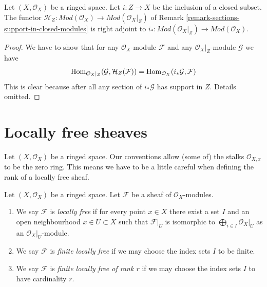 \begin{lemma}
\label{lemma-adjoint-section-with-support}
Let $(X, \mathcal{O}_X)$ be a ringed space. Let $i : Z \to X$ be the
inclusion of a closed subset. The functor
$\mathcal{H}_Z : \textit{Mod}(\mathcal{O}_X) \to
\textit{Mod}(\mathcal{O}_X|_Z)$ of
Remark \ref{remark-sections-support-in-closed-modules}
is right adjoint to
$i_* : \textit{Mod}(\mathcal{O}_X|_Z) \to \textit{Mod}(\mathcal{O}_X)$.
\end{lemma}

\begin{proof}
We have to show that for any $\mathcal{O}_X$-module $\mathcal{F}$
and any $\mathcal{O}_X|_Z$-module $\mathcal{G}$ we have
$$
\mathop{\mathrm{Hom}}\nolimits_{\mathcal{O}_X|_Z}(\mathcal{G}, \mathcal{H}_Z(\mathcal{F})) =
\mathop{\mathrm{Hom}}\nolimits_{\mathcal{O}_X}(i_*\mathcal{G}, \mathcal{F})
$$
This is clear
because after all any section of $i_*\mathcal{G}$ has support in $Z$.
Details omitted.
\end{proof}










\section{Locally free sheaves}
\label{section-locally-free}

\noindent
Let $(X, \mathcal{O}_X)$ be a ringed space.
Our conventions allow (some of) the stalks $\mathcal{O}_{X, x}$
to be the zero ring. This means we have to be a little careful
when defining the rank of a locally free sheaf.

\begin{definition}
\label{definition-locally-free}
\begin{reference}
\cite[Chapter II, \S 2, no. 41, Proposition 5, p. 233]{FAC}
\end{reference}
Let $(X, \mathcal{O}_X)$ be a ringed space.
Let $\mathcal{F}$ be a sheaf of $\mathcal{O}_X$-modules.
\begin{enumerate}
\item We say $\mathcal{F}$ is {\it locally free} if for every
point $x \in X$ there exist a set $I$ and an open
neighbourhood $x \in U \subset X$
such that $\mathcal{F}|_U$ is isomorphic to
$\bigoplus_{i \in I} \mathcal{O}_X|_U$ as an $\mathcal{O}_X|_U$-module.
\item We say $\mathcal{F}$ is {\it finite locally free} if we may
choose the index sets $I$ to be finite.
\item We say $\mathcal{F}$ is {\it finite locally free of rank $r$}
if we may choose the index sets $I$ to have cardinality $r$.
\end{enumerate}
\end{definition}

